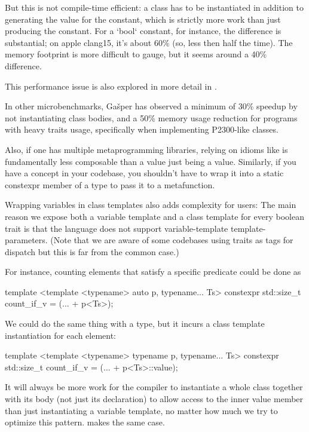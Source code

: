 \documentclass{wg21}
\begin{document}
But this is not compile-time efficient: a class has to be instantiated in addition to generating the value for the constant, which is strictly more work than just producing the constant.
For a `bool` constant, for instance, the difference is substantial; on apple clang15, it's about 60\% (so, less then half the time).
The memory footprint is more difficult to gauge, but it seems around a 40\% difference.

This performance issue is also explored in more detail in .

In other microbenchmarks, Gašper has observed a minimum of 30\% speedup by not instantiating class bodies, and a 50\% memory usage reduction for programs with heavy traits usage, specifically when implementing P2300-like classes.

Also, if one has multiple metaprogramming libraries, relying on idioms like  is fundamentally less composable than a value just being a value.
Similarly, if you have a concept in your codebase, you shouldn't have to wrap it into a static constexpr  member of a type to pass it to a metafunction.

Wrapping variables in class templates also adds complexity for users: The main reason we expose both a variable template and a class template for every boolean trait is that the language does not support variable-template template-parameters. (Note that we are aware of some codebases using traits as tags for dispatch but this is far from the common case.)

For instance, counting elements that satisfy a specific predicate could be done as

\begin{colorblock}
template <template <typename> auto p, typename... Ts>
constexpr std::size_t count_if_v = (... + p<Ts>);
\end{colorblock}

We could do the same thing with a type, but it incurs a class template instantiation for each element:

\begin{colorblock}
template <template <typename> typename p, typename... Ts>
constexpr std::size_t count_if_v = (... + p<Ts>::value);
\end{colorblock}

It will always be more work for the compiler to instantiate a whole class together with its body (not just its declaration) to allow access to the inner value member than just instantiating a variable template, no matter how much we try to optimize this pattern.  makes the same case.
\end{document}
